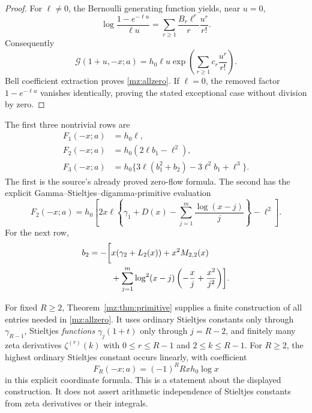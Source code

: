 \documentclass[11pt,letterpaper]{article}
\numberwithin{equation}{section}
\theoremstyle{plain}
\theoremstyle{definition}
\theoremstyle{remark}
\begin{document}
\begin{proof}
For $\ell\ne0$, the Bernoulli generating function yields, near $u=0$,
\begin{equation}
 \log\frac{1-e^{-\ell u}}{\ell u}
       =\sum_{r\ge1}\frac{B_r\ell^r}{r}\frac{u^r}{r!}.
 \label{mz:Bernoulli}
\end{equation}
Consequently
\[
 \mathcal G(1+u,-x;a)
       =h_0\ell u\exp\left(\sum_{r\ge1}c_r\frac{u^r}{r!}\right).
\]
Bell coefficient extraction proves \eqref{mz:allzero}. If $\ell=0$,
the removed factor $1-e^{-\ell u}$ vanishes identically, proving the
stated exceptional case without division by zero.
\end{proof}

The first three nontrivial rows are
\begin{align}
 F_1(-x;a)&=h_0\ell,\label{mz:F1}\\
 F_2(-x;a)&=h_0(2\ell b_1-\ell^2),\label{mz:F2b}\\
 F_3(-x;a)&=h_0\{3\ell(b_1^2+b_2)-3\ell^2b_1+\ell^3\}.
 \label{mz:F3}
\end{align}
The first is the source's already proved zero-flow formula. The second has
the explicit Gamma--Stieltjes--digamma-primitive evaluation
\begin{equation}
 \boxed{F_2(-x;a)=h_0\left[
   2x\ell\left\{\gamma_1+D(x)
           -\sum_{j=1}^{m}\frac{\log(x-j)}j\right\}-\ell^2\right].}
 \label{mz:F2}
\end{equation}
For the next row,
\begin{align}
 b_2=-\biggl[&x(\gamma_2+L_2(x))+x^2M_{2,2}(x)\notag\\
 &+\sum_{j=1}^{m}\log^2(x-j)
                    \left(-\frac xj+\frac{x^2}{j^2}\right)\biggr].
 \label{mz:b2}
\end{align}

For fixed $R\ge2$, Theorem~\ref{mz:thm:primitive} supplies a finite construction
of all entries needed in \eqref{mz:allzero}. It uses ordinary Stieltjes
constants only through $\gamma_{R-1}$, Stieltjes \emph{functions}
$\gamma_j(1+t)$ only through $j=R-2$, and finitely many zeta derivatives
$\zeta^{(r)}(k)$ with $0\le r\le R-1$ and $2\le k\le R-1$.
For $R\ge2$, the highest ordinary Stieltjes constant occurs linearly,
with coefficient
\begin{equation}
 [\gamma_{R-1}]F_R(-x;a)
       =(-1)^R R x h_0\log x
 \label{mz:highest}
\end{equation}
in this explicit coordinate formula. This is a statement about the
displayed construction. It does not assert arithmetic independence of
Stieltjes constants from zeta derivatives or their integrals.
\end{document}
